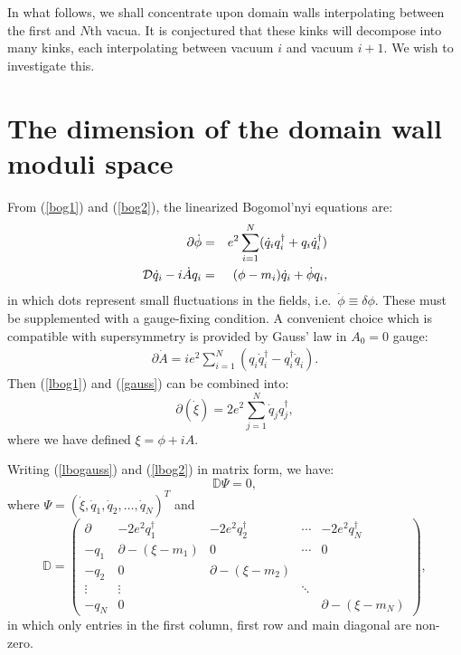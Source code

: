 \documentclass[a4paper,preprint,preprintnumbers,amsmath,amssymb]{revtex4}
\begin{document}
In what follows, we shall concentrate upon domain walls interpolating between 
the first and $N$th vacua. It is conjectured that these kinks will decompose 
into many kinks, each interpolating between vacuum $i$ and vacuum $i+1$. 
We wish to investigate this.

\section{\label{sec:index} The dimension of the domain wall moduli space}

From (\ref{bog1}) and (\ref{bog2}), the linearized Bogomol'nyi equations are:
\begin{eqnarray}
\partial\dot{\phi}&=&e^2\sum_{i=1}^N(\dot{q}_i{q}^\dagger_i+q_i
\dot{q}^\dagger_i) \label{lbog1}\\
{\cal D}\dot{q}_i-i\dot{A}q_i&=&(\phi-m_i)\dot{q}_i+\dot{\phi}q_i,
\label{lbog2}
\end{eqnarray}
in which dots represent small fluctuations in the fields, i.e.\
$\dot{\phi} \equiv \delta\phi$.
These must be supplemented with a gauge-fixing condition. A convenient
choice which is compatible with supersymmetry is provided by Gauss' law in
$A_0=0$ gauge:
\begin{eqnarray}
\partial \dot{A}=ie^2\sum_{i=1}^N(q_i \dot{q}^\dagger_i
-{q}^\dagger_i \dot{q}_i).
\label{gauss}
\end{eqnarray}
Then (\ref{lbog1}) and (\ref{gauss}) can be combined
into:
\begin{equation}
\partial(\dot{\xi})=2e^2\sum_{j=1}^N\dot{q}_jq_j^\dagger,
   \label{lbogauss}
\end{equation}
where we have defined $ \xi = \phi + i A $.

%
Writing (\ref{lbogauss}) and (\ref{lbog2}) in matrix form, we have:
\begin{equation}
    \mathbb{D} \Psi = 0, 
\end{equation}  
where
$
   \Psi = (\dot{\xi}, \dot{q}_1, \dot{q}_2, \ldots, \dot{q}_N)^{T} 
$
and
\begin{equation}
     \mathbb{D}
   = \left(\begin{array}{ccccc}
    \partial & -2e^2 q_1^\dagger & -2e^2 q_2^\dagger  
             & \cdots  & -2e^2 q_N^\dagger \\  
    -q_1 & \partial - (\xi - m_1)  & 0   & \cdots & 0 \\
    -q_2 & 0 &  \partial - (\xi - m_2) &  & \\  
     \vdots & \vdots &  & \ddots & \\
    -q_N & 0  &   &  & \partial - (\xi - m_N)
   \end{array}\right),
   \label{eq:D}
\end{equation}
in which only entries in the first column, first row and main diagonal
are non-zero.
\end{document}
